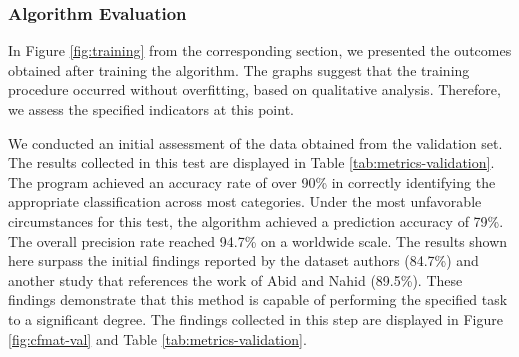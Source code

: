 \subsubsection{Algorithm Evaluation}

In Figure \ref{fig:training} from the corresponding section, we presented the outcomes obtained after training the algorithm. The graphs suggest that the training procedure occurred without overfitting, based on qualitative analysis. Therefore, we assess the specified indicators at this point. 

We conducted an initial assessment of the data obtained from the validation set. The results collected in this test are displayed in Table \ref{tab:metrics-validation}. The program achieved an accuracy rate of over 90\% in correctly identifying the appropriate classification across most categories. Under the most unfavorable circumstances for this test, the algorithm achieved a prediction accuracy of 79\%. The overall precision rate reached 94.7\% on a worldwide scale. The results shown here surpass the initial findings reported by the dataset authors \cite{sikder2021ku} (84.7\%) and another study that references the work of Abid and Nahid \cite{abid2021two} (89.5\%). These findings demonstrate that this method is capable of performing the specified task to a significant degree. The findings collected in this step are displayed in Figure \ref{fig:cfmat-val} and Table \ref{tab:metrics-validation}.



